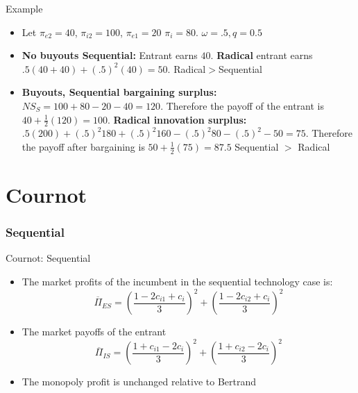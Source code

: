 \documentclass{beamer}
\begin{document}
\begin{frame}{Example}
\begin{itemize}
    \item Let $\pi_{e2}=40$, $\pi_{i2}=100$, $\pi_{e1}=20$ $\pi_{i}=80$. $\omega = .5, q=0.5$ \\
    \item \textbf{No buyouts Sequential:} Entrant earns $40$. \textbf{Radical} entrant earns $.5(40+40)+(.5)^2(40)=50$. \newline Radical$>$Sequential 
    \item \textbf{Buyouts, Sequential bargaining surplus:}  $NS_S = 100+80-20-40=120$. Therefore the payoff of the entrant is $40+\frac{1}{2}(120)=100$. \newline \textbf{Radical innovation surplus:} $ .5(200)+(.5)^2 180+(.5)^2 160-(.5)^2 80-(.5)^2-50=75$. Therefore the payoff after bargaining is $50+\frac{1}{2}(75)=87.5$ 
    \newline
    Sequential $>$ Radical
\end{itemize}
\end{frame}


\section{Cournot}

\subsubsection{Sequential}
\begin{frame}{Cournot: Sequential}
\begin{itemize}
    \item The market profits of the incumbent in the sequential technology case is:
    \begin{equation*}
        \overline{\Pi}_{ES} =
        \left(\frac{1-2 c_{i1}+c_{i}}{3}  \right)^2
        +
        \left(\frac{1-2 c_{i2}+c_{i}}{3}  \right)^2
    \end{equation*}
    \item The market payoffs of the entrant 
    \begin{equation*}
        \overline{\Pi}_{IS} =  
\left(\frac{1+ c_{i1}-2c_{i}}{3}  \right)^2
+ \left(\frac{1+ c_{i2}-2c_{i}}{3}  \right)^2
    \end{equation*}
    \item The monopoly profit is unchanged relative to Bertrand
\end{itemize}
\end{frame}
\end{document}
